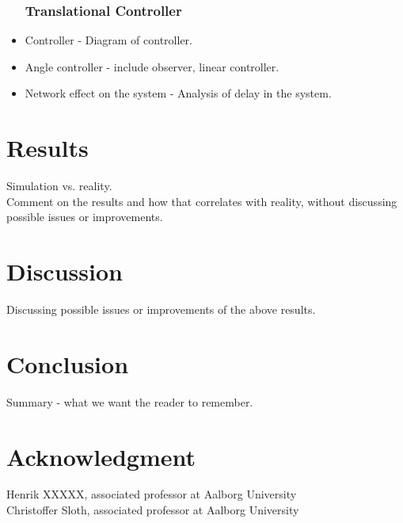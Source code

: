 \begin{itemize}
\subsubsection{Translational Controller}
\item Controller - Diagram of controller.
	\item Angle controller - include observer, linear controller.
\item Network effect on the system - Analysis of delay in the system.
\end{itemize}
\section{Results}
Simulation vs. reality. \\
Comment on the results and how that correlates with reality, without discussing possible issues or improvements.

\section{Discussion}
Discussing possible issues or improvements of the above results.

\section{Conclusion}
Summary - what we want the reader to remember.
\section*{Acknowledgment}
Henrik XXXXX, associated professor at Aalborg University \\
Christoffer Sloth, associated professor at Aalborg University



%
\printbibliography
%
%




